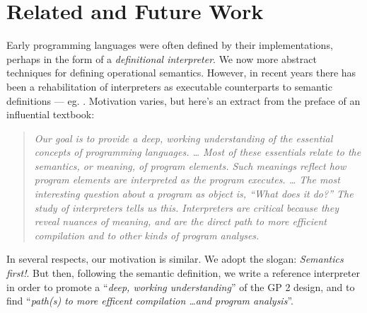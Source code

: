 \section{Related and Future Work}
\label{sec:relatedandfuture}
Early programming languages were often defined by their implementations,
perhaps in the form of a \emph{definitional interpreter}.
We now more abstract techniques for defining operational semantics.
However, in recent years there has been a 
rehabilitation of interpreters as executable counterparts to semantic
definitions --- eg. \cite{Campbell2012}. 
Motivation varies, but here's an extract from the preface
of an influential textbook: 
\begin{quote}
\textit{Our goal is to provide a deep, working understanding of the essential concepts of programming languages. \ldots
Most of these essentials relate to the semantics, or meaning, of program elements. Such meanings reflect how program elements are interpreted as the program executes. \ldots
The most interesting question about a program as object is, \textnormal{``What does it do?''} The study of interpreters tells us this. Interpreters are critical because they reveal nuances of meaning, and are the direct path to more efficient compilation and to other kinds of program analyses.} \cite{Friedmanetal2008}
\end{quote}
In several respects, our motivation is similar.
We adopt the slogan: \emph{Semantics first!}.
But then, following the semantic definition, we write a reference interpreter in order to
promote a ``\textit{deep, working understanding}'' of the GP 2 design,
and to find ``\textit{path(s) to more efficent compilation \ldots and program analysis}''.

